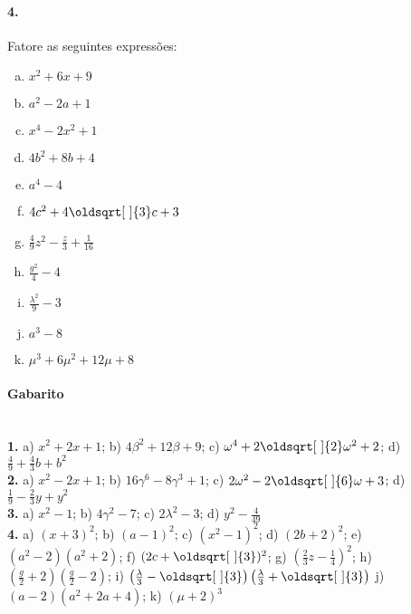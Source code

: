 \documentclass[a4paper,12pt]{article}
\renewcommand*{\sqrt}[2][\ ]{\oldsqrt[#1]{#2}}
\begin{document}
\begin{multicols}{2}
\paragraph{4.} Fatore as seguintes expressões:
\begin{enumerate}[a)]
\item $x^2 + 6x + 9$
\item $a^2 - 2a + 1$
\item $x^4 - 2x^2 + 1$
\item $4b^2 + 8b + 4$ 
\item $a^4 - 4$
\item $4c^2 + 4\sqrt{3}c + 3$
\item $ \frac{4}{9}z^2 - \frac{z}{3} + \frac{1}{16}$
\item $ \frac{g^2}{4} - 4$ 
\item $ \frac{\lambda^2}{9} - 3$ 
\item $a^3 - 8$
\item $\mu^3 + 6\mu^2 + 12\mu + 8$
\end{enumerate}
\vspace*{3cm}
\end{multicols}
 
\vspace*{\fill}
{\footnotesize \color{darkgray}
\paragraph*{Gabarito} \hspace*{\fill}\\
\textbf{1.} a) $x^2 + 2x + 1$; b) $4\beta^2 + 12\beta + 9$; c) $\omega^4 + 2\sqrt{2}\omega^2 + 2$; d) $\frac{4}{9} + \frac{4}{3}b + b^2$\\
\textbf{2.} a) $x^2 - 2x + 1$; b) $16\gamma^6 - 8\gamma^3 + 1$; c) $2\omega^2 - 2\sqrt{6}\omega + 3$; d) $\frac{1}{9} - \frac{2}{3}y + y^2$\\
\textbf{3.} a) $x^2 - 1$; b) $4\gamma^2 - 7$; c) $2\lambda^2 - 3$; d) $y^2 - \frac{4}{49}$\\
\textbf{4.} a) $(x + 3)^2$; b) $(a-1)^2 $; c) $(x^2 - 1)^2$; d) $(2b + 2)^2$; e) $(a^2 - 2)(a^2 + 2)$; f) $(2c + \sqrt{3})^2$; g) $\left(\frac{2}{3}z - \frac{1}{4}\right)^2$; h) $\left(\frac{g}{2} + 2\right)\left(\frac{g}{2} - 2\right)$; i) $\left(\frac{\lambda}{3} - \sqrt{3}\right)\left(\frac{\lambda}{3} + \sqrt{3}\right)$
j) $(a - 2)(a^2 + 2a + 4)$; k) $(\mu + 2)^3$
}
\end{document}
